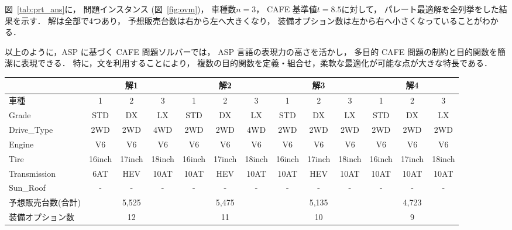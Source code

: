 図~\ref{tab:prt_ans}に，
問題インスタンス (図~\ref{fig:ovm})，
車種数$n=3$，
CAFE 基準値$t=8.5$に対して，
パレート最適解を全列挙をした結果を示す．
解は全部で4つあり，
予想販売台数は右から左へ大きくなり，
装備オプション数は左から右へ小さくなっていることがわかる．

以上のように，ASP に基づく CAFE 問題ソルバーでは，
ASP 言語の表現力の高さを活かし，
多目的 CAFE 問題の制約と目的関数を簡潔に表現できる．
特に，文を利用することにより，
複数の目的関数を定義・組合せ，柔軟な最適化が可能な点が大きな特長である．


  

\begin{figure*}[t]\centering
  \tabcolsep=1mm
  \begin{tabular}{l|c|c|c||c|c|c||c|c|c||c|c|c}\bhline
    & \multicolumn{3}{c||}{解1} & \multicolumn{3}{c||}{解2} & \multicolumn{3}{c||}{解3} & \multicolumn{3}{c}{解4}\\ \hline
    車種 & 1 & 2 & 3 & 1 & 2 & 3 & 1 & 2 & 3 & 1 & 2 & 3 \\ \hline
    \textsf{Grade} & \textsf{STD} & \textsf{DX} & \textsf{LX} & \textsf{STD} & \textsf{DX} & \textsf{LX} & \textsf{STD} & \textsf{DX} & \textsf{LX} & \textsf{STD} & \textsf{DX} & \textsf{LX} \\
    \textsf{Drive\_Type} & \textsf{2WD} & \textsf{2WD} & \textsf{4WD} & \textsf{2WD} & \textsf{2WD} & \textsf{4WD} & \textsf{2WD} & \textsf{2WD} & \textsf{2WD} & \textsf{2WD} & \textsf{2WD} & \textsf{2WD} \\
    \textsf{Engine} & \textsf{V6} & \textsf{V6} & \textsf{V6} & \textsf{V6} & \textsf{V6} & \textsf{V6} & \textsf{V6} & \textsf{V6} & \textsf{V6} & \textsf{V6} & \textsf{V6} & \textsf{V6} \\
    \textsf{Tire} & \textsf{16inch} & \textsf{17inch} & \textsf{18inch} & \textsf{16inch} & \textsf{17inch} & \textsf{18inch} & \textsf{16inch} & \textsf{17inch} & \textsf{18inch} & \textsf{16inch} & \textsf{17inch} & \textsf{18inch} \\
    \textsf{Transmission} & \textsf{6AT} & \textsf{HEV} & \textsf{10AT} & \textsf{10AT} & \textsf{HEV} & \textsf{10AT} & \textsf{10AT} & \textsf{HEV} & \textsf{10AT} & \textsf{10AT} & \textsf{10AT} & \textsf{10AT} \\
    \textsf{Sun\_Roof} & \textsf{-} & \textsf{-} & \textsf{-} & \textsf{-} & \textsf{-} & \textsf{-} & \textsf{-} & \textsf{-} & \textsf{-} & \textsf{-} & \textsf{-} & \textsf{-} \\\bhline
    予想販売台数(合計)  & \multicolumn{3}{c||}{5,525} & \multicolumn{3}{c||}{5,475} & \multicolumn{3}{c||}{5,135} & \multicolumn{3}{c}{4,723} \\ 
   装備オプション数 & \multicolumn{3}{c||}{12} & \multicolumn{3}{c||}{11} & \multicolumn{3}{c||}{10} & \multicolumn{3}{c}{9} \\ \hline
  \end{tabular}
  \label{tab:prt_ans}
  \caption{多目的 CAFE 問題(図~\ref{fig:ovm})のパレート最適解全列挙}
\end{figure*}


